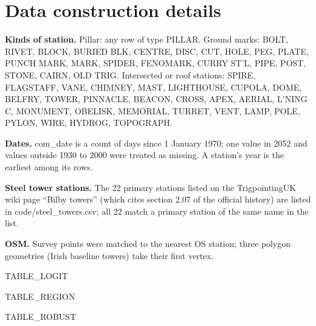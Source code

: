 \documentclass[11pt,a4paper]{article}
\begin{document}
\appendix
\section{Data construction details}\label{app:data}
{\raggedright\textbf{Kinds of station.} Pillar: any row of type PILLAR. Ground marks: BOLT, RIVET, BLOCK, BURIED BLK, CENTRE, DISC, CUT, HOLE, PEG, PLATE, PUNCH MARK, MARK, SPIDER, FENOMARK, CURRY ST'L, PIPE, POST, STONE, CAIRN, OLD TRIG. Intersected or roof stations: SPIRE, FLAGSTAFF, VANE, CHIMNEY, MAST, LIGHTHOUSE, CUPOLA, DOME, BELFRY, TOWER, PINNACLE, BEACON, CROSS, APEX, AERIAL, L'NING C, MONUMENT, OBELISK, MEMORIAL, TURRET, VENT, LAMP, POLE, PYLON, WIRE, HYDROG, TOPOGRAPH.\par}

\textbf{Dates.} com\_date is a count of days since 1 January 1970; one value in 2052 and values outside 1930 to 2000 were treated as missing. A station's year is the earliest among its rows.

\textbf{Steel tower stations.} The 22 primary stations listed on the TrigpointingUK wiki page ``Bilby towers'' (which cites section 2.07 of the official history) are listed in code/steel\_towers.csv; all 22 match a primary station of the same name in the list.

\textbf{OSM.} Survey points were matched to the nearest OS station; three polygon geometries (Irish baseline towers) take their first vertex.

{{TABLE_LOGIT}}

{{TABLE_REGION}}

{{TABLE_ROBUST}}
\end{document}
